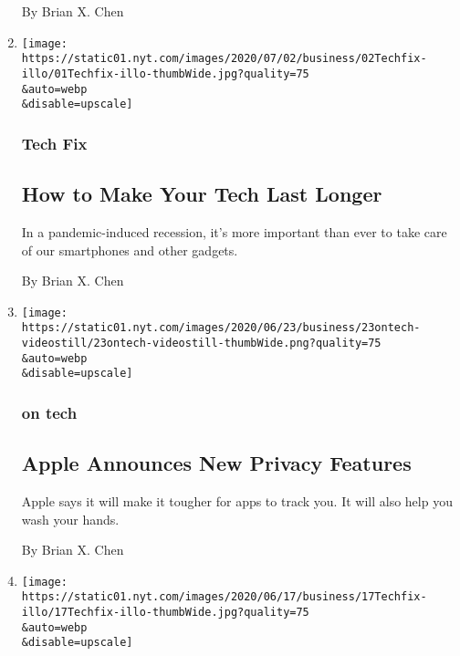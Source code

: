 \begin{enumerate}
  By Brian X. Chen
\item
  \href{/2020/07/01/technology/personaltech/make-your-tech-last-longer.html}{}

  \texttt{[image: https://static01.nyt.com/images/2020/07/02/business/02Techfix-illo/01Techfix-illo-thumbWide.jpg?quality=75\\\&auto=webp\\\&disable=upscale]}

  \hypertarget{tech-fix-3}{%
  \subsubsection{Tech Fix}\label{tech-fix-3}}

  \hypertarget{how-to-make-your-tech-last-longer}{%
  \subsection{How to Make Your Tech Last
  Longer}\label{how-to-make-your-tech-last-longer}}

  In a pandemic-induced recession, it's more important than ever to take
  care of our smartphones and other gadgets.

  By Brian X. Chen
\item
  \href{/2020/06/23/technology/apple-announces-new-privacy-features.html}{}

  \texttt{[image: https://static01.nyt.com/images/2020/06/23/business/23ontech-videostill/23ontech-videostill-thumbWide.png?quality=75\\\&auto=webp\\\&disable=upscale]}

  \hypertarget{on-tech}{%
  \subsubsection{on tech}\label{on-tech}}

  \hypertarget{apple-announces-new-privacy-features}{%
  \subsection{Apple Announces New Privacy
  Features}\label{apple-announces-new-privacy-features}}

  Apple says it will make it tougher for apps to track you. It will also
  help you wash your hands.

  By Brian X. Chen
\item
  \href{/2020/06/17/technology/personaltech/hey-email-service-screening.html}{}

  \texttt{[image: https://static01.nyt.com/images/2020/06/17/business/17Techfix-illo/17Techfix-illo-thumbWide.jpg?quality=75\\\&auto=webp\\\&disable=upscale]}


\end{enumerate}
